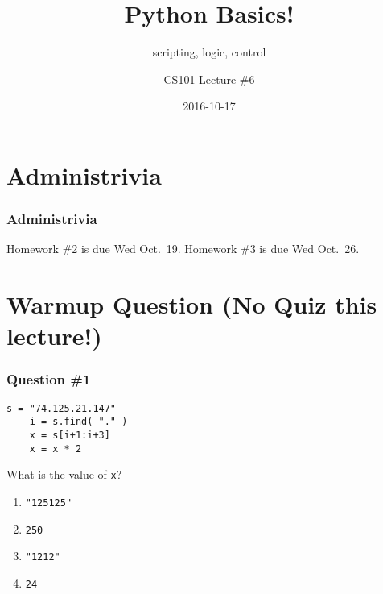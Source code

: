 \documentclass[11pt]{beamer}
\title{Python Basics!}
\subtitle{scripting, logic, control}
\author{CS101 Lecture \#6}
\date{2016-10-17}
\begin{document}
  \setcounter{showProgressBar}{0}
  \setcounter{showSlideNumbers}{0}

\frame{\titlepage}

\setcounter{framenumber}{0}
\setcounter{showProgressBar}{1}
\setcounter{showSlideNumbers}{1}

\section{Administrivia}

\begin{frame}
  \frametitle{Administrivia}
  \Enlarge
  \begin{itemize}
  \myitem  Homework \#2 is due Wed Oct.\ 19.
  \myitem  Homework \#3 is due Wed Oct.\ 26.
  \end{itemize}
\end{frame}

\section{Warmup Question (No Quiz this lecture!)}

\begin{frame}[fragile]
	\frametitle{Question \#1}
	\Enlarge
	
	\begin{Verbatim}[commandchars=\\\{\},commentchar=\%]
    s = "74.125.21.147"
    i = s.find( "." )
    x = s[i+1:i+3]
    x = x * 2
	\end{Verbatim}
	What is the value of \texttt{x}?
	\begin{enumerate}[label=\Alph*]
		\item  \texttt{"125125"}
		\item  \texttt{250}
		\item  \texttt{"1212"} %
		\item  \texttt{24}
	\end{enumerate}
\end{frame}


\end{document}
